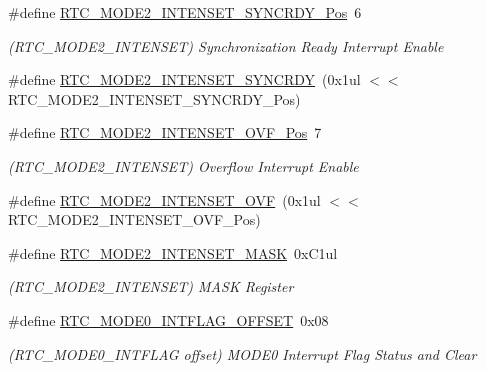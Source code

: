 \begin{DoxyCompactItemize}
\item 
\#define \mbox{\hyperlink{group___s_a_m_d21___r_t_c_ga6996d632dc77484061dfc127b1bd70dc}{R\+T\+C\+\_\+\+M\+O\+D\+E2\+\_\+\+I\+N\+T\+E\+N\+S\+E\+T\+\_\+\+S\+Y\+N\+C\+R\+D\+Y\+\_\+\+Pos}}~6
\begin{DoxyCompactList}\small\item\em (R\+T\+C\+\_\+\+M\+O\+D\+E2\+\_\+\+I\+N\+T\+E\+N\+S\+ET) Synchronization Ready Interrupt Enable \end{DoxyCompactList}\item 
\#define \mbox{\hyperlink{group___s_a_m_d21___r_t_c_gac5610a286c16ff768d0a1960fa26ea10}{R\+T\+C\+\_\+\+M\+O\+D\+E2\+\_\+\+I\+N\+T\+E\+N\+S\+E\+T\+\_\+\+S\+Y\+N\+C\+R\+DY}}~(0x1ul $<$$<$ R\+T\+C\+\_\+\+M\+O\+D\+E2\+\_\+\+I\+N\+T\+E\+N\+S\+E\+T\+\_\+\+S\+Y\+N\+C\+R\+D\+Y\+\_\+\+Pos)
\item 
\#define \mbox{\hyperlink{group___s_a_m_d21___r_t_c_ga8fec704078b27c1e1411d25333f55f1d}{R\+T\+C\+\_\+\+M\+O\+D\+E2\+\_\+\+I\+N\+T\+E\+N\+S\+E\+T\+\_\+\+O\+V\+F\+\_\+\+Pos}}~7
\begin{DoxyCompactList}\small\item\em (R\+T\+C\+\_\+\+M\+O\+D\+E2\+\_\+\+I\+N\+T\+E\+N\+S\+ET) Overflow Interrupt Enable \end{DoxyCompactList}\item 
\#define \mbox{\hyperlink{group___s_a_m_d21___r_t_c_ga2fa2499c5ea7eef57b3ef1f5a7e4e37b}{R\+T\+C\+\_\+\+M\+O\+D\+E2\+\_\+\+I\+N\+T\+E\+N\+S\+E\+T\+\_\+\+O\+VF}}~(0x1ul $<$$<$ R\+T\+C\+\_\+\+M\+O\+D\+E2\+\_\+\+I\+N\+T\+E\+N\+S\+E\+T\+\_\+\+O\+V\+F\+\_\+\+Pos)
\item 
\#define \mbox{\hyperlink{group___s_a_m_d21___r_t_c_ga9fa1d7355ebfb79ba256ef38c40b9ff6}{R\+T\+C\+\_\+\+M\+O\+D\+E2\+\_\+\+I\+N\+T\+E\+N\+S\+E\+T\+\_\+\+M\+A\+SK}}~0x\+C1ul
\begin{DoxyCompactList}\small\item\em (R\+T\+C\+\_\+\+M\+O\+D\+E2\+\_\+\+I\+N\+T\+E\+N\+S\+ET) M\+A\+SK Register \end{DoxyCompactList}\item 
\#define \mbox{\hyperlink{group___s_a_m_d21___r_t_c_gad3aa7f615a991577a4deab1e8be2bf81}{R\+T\+C\+\_\+\+M\+O\+D\+E0\+\_\+\+I\+N\+T\+F\+L\+A\+G\+\_\+\+O\+F\+F\+S\+ET}}~0x08
\begin{DoxyCompactList}\small\item\em (R\+T\+C\+\_\+\+M\+O\+D\+E0\+\_\+\+I\+N\+T\+F\+L\+AG offset) M\+O\+D\+E0 Interrupt Flag Status and Clear \end{DoxyCompactList}\item 

\end{DoxyCompactItemize}
